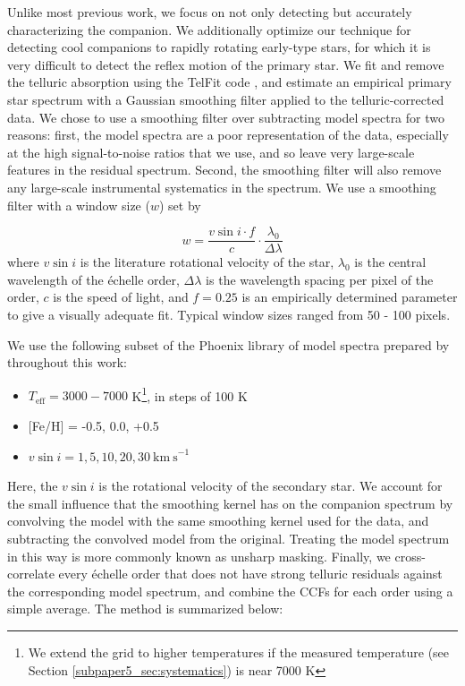Unlike most previous work, we focus on not only detecting but accurately characterizing the companion. We additionally optimize our technique for detecting cool companions to rapidly rotating early-type stars, for which it is very difficult to detect the reflex motion of the primary star. We fit and remove the telluric absorption using the TelFit code \citep{Gullikson2014}, and estimate an empirical primary star spectrum with a Gaussian smoothing filter applied to the telluric-corrected data. We chose to use a smoothing filter over subtracting model spectra for two reasons: first, the model spectra are a poor representation of the data, especially at the high signal-to-noise ratios that we use, and so leave very large-scale features in the residual spectrum. Second, the smoothing filter will also remove any large-scale instrumental systematics in the spectrum. We use a smoothing filter with a  window size ($w$) set by

\begin{equation}
w = \frac{v\sin{i} \cdot f}{c} \cdot \frac{\lambda_0}{\Delta \lambda}
\label{paper5_eqn:smoothing}
\end{equation}
where $v\sin{i}$ is the literature rotational velocity of the star, $\lambda_0$ is the central wavelength of the \'echelle order, $\Delta \lambda$ is the wavelength spacing per pixel of the order, $c$ is the speed of light, and $f = 0.25$ is an empirically determined parameter to give a visually adequate fit. Typical window sizes ranged from 50 - 100 pixels.

We use the following subset of the Phoenix library of model spectra prepared by \cite{Husser2013_b} throughout this work:

\begin{itemize}
\item $T_\mathrm{eff} = 3000-7000$ K\footnote{We extend the grid to higher temperatures if the measured temperature (see Section \ref{subpaper5_sec:systematics}) is near 7000 K}, in steps of 100 K
\item {[}Fe/H{]} = -0.5, 0.0, +0.5
\item $v\sin{i} = 1, 5, 10, 20, 30 \ \mathrm{km\ s}^{-1}$
\end{itemize}
Here, the $v\sin{i}$ is the rotational velocity of the secondary star. We account for the small influence that the smoothing kernel has on the companion spectrum by convolving the model with the same smoothing kernel used for the data, and subtracting the convolved model from the original. Treating the model spectrum in this way is more commonly known as unsharp masking. Finally, we cross-correlate every \'echelle order that does not have strong telluric residuals against the corresponding model spectrum, and combine the CCFs for each order using a simple average. The method is summarized below:

